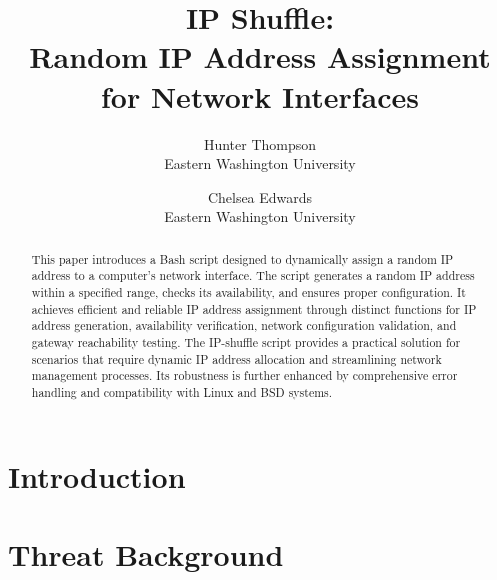\documentclass[letterpaper,twocolumn,10pt]{article}
\begin{document}

\date{}

\title{\Large \bf IP Shuffle:\\
  Random IP Address Assignment for Network Interfaces}

\author{
{\rm Hunter Thompson}\\
Eastern Washington University
\and
{\rm Chelsea Edwards}\\
Eastern Washington University
} %

\maketitle

\begin{abstract}
This paper introduces a Bash script designed to dynamically assign a random IP address to a computer's network interface. The script generates a random IP address within a specified range, checks its availability, and ensures proper configuration. It achieves efficient and reliable IP address assignment through distinct functions for IP address generation, availability verification, network configuration validation, and gateway reachability testing. The IP-shuffle script provides a practical solution for scenarios that require dynamic IP address allocation and streamlining network management processes. Its robustness is further enhanced by comprehensive error handling and compatibility with Linux and BSD systems.
\end{abstract}


\section{Introduction}


\section{Threat Background}

\end{document}
